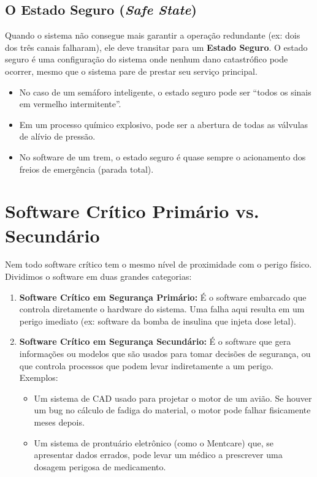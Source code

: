 \documentclass[12pt,a4paper,twoside]{report}
\begin{document}
\subsection{O Estado Seguro (\textit{Safe State})}
Quando o sistema não consegue mais garantir a operação redundante (ex: dois dos três canais falharam), ele deve transitar para um \textbf{Estado Seguro}. O estado seguro é uma configuração do sistema onde nenhum dano catastrófico pode ocorrer, mesmo que o sistema pare de prestar seu serviço principal.
\begin{itemize}
    \item No caso de um semáforo inteligente, o estado seguro pode ser ``todos os sinais em vermelho intermitente''.
    \item Em um processo químico explosivo, pode ser a abertura de todas as válvulas de alívio de pressão.
    \item No software de um trem, o estado seguro é quase sempre o acionamento dos freios de emergência (parada total).
\end{itemize}

\section{Software Crítico Primário vs. Secundário}

Nem todo software crítico tem o mesmo nível de proximidade com o perigo físico. Dividimos o software em duas grandes categorias:

\begin{enumerate}
    \item \textbf{Software Crítico em Segurança Primário:} É o software embarcado que controla diretamente o hardware do sistema. Uma falha aqui resulta em um perigo imediato (ex: software da bomba de insulina que injeta dose letal).
    \item \textbf{Software Crítico em Segurança Secundário:} É o software que gera informações ou modelos que são usados para tomar decisões de segurança, ou que controla processos que podem levar indiretamente a um perigo. Exemplos:
    \begin{itemize}
        \item Um sistema de CAD usado para projetar o motor de um avião. Se houver um bug no cálculo de fadiga do material, o motor pode falhar fisicamente meses depois.
        \item Um sistema de prontuário eletrônico (como o Mentcare) que, se apresentar dados errados, pode levar um médico a prescrever uma dosagem perigosa de medicamento.
    \end{itemize}
\end{enumerate}
\end{document}
